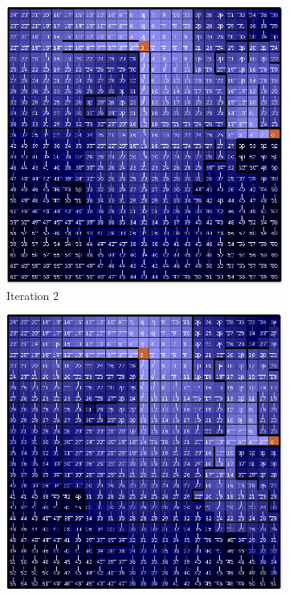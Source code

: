 \documentclass[letterpaper]{article}
\begin{document}
	\begin{figure}
		\centering
		\begin{subfigure}[t]{.23\textwidth}
			\centering
			\includegraphics[width=\linewidth]{images/big_pi_2}
			\caption{Iteration 2}
		\end{subfigure}
		\begin{subfigure}[t]{.23\textwidth}
			\centering
			\includegraphics[width=\linewidth]{images/big_pi_4}

\end{subfigure}
\end{figure}
\end{document}
